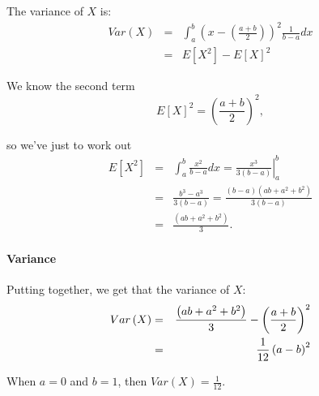 \documentclass[notes=show,smaller,handout]{beamer}\usepackage[]{graphicx}\usepackage[]{color}
\begin{document}
\begin{frame}{\subsecname}
  The variance of $X$ is:
  \begin{eqnarray*}
  Var\left( X\right) &=&\int_{a}^{b}\left( x-\left( \frac{a+b}{2}\right)
  \right) ^{2}\frac{1}{b-a}dx \\
  &=&E\left[ X^{2}\right] -E\left[ X\right] ^{2}
  \end{eqnarray*}

  We know the second term
  \begin{equation*}
  E\left[ X\right] ^{2}=\left( \frac{a+b}{2}\right) ^{2},
  \end{equation*}

  so we've just to work out%
  \begin{eqnarray*}
  E\left[ X^{2}\right] &=&\int_{a}^{b}\frac{x^{2}}{b-a}dx =\left. \frac{x^{3}}{3\left( b-a\right) }\right\vert _{a}^{b} \\
  &=&\frac{b^{3}-a^{3}}{3\left( b-a\right) } = \frac{(b-a)\left( ab+a^{2}+b^{2}\right)}{3\left( b-a\right) } \\
  &=&\frac{\left( ab+a^{2}+b^{2}\right) }{3}.
  \end{eqnarray*}

\end{frame}

\begin{frame}{\subsecname}
  \framesubtitle{Variance}

  Putting together, we get that the variance of $X$:%
  \begin{eqnarray*}
  Var\left( X\right) &=&\frac{\left( ab+a^{2}+b^{2}\right) }{3}-\left( \frac{%
  a+b}{2}\right) ^{2} \\
  &=&\frac{1}{12}\left( a-b\right) ^{2}
  \end{eqnarray*}

  \begin{example} [continued]
  When $a=0$ and $b=1$, then $Var\left( X\right) =\frac{1}{12}$.
  \end{example}
\end{frame}%
\end{document}
